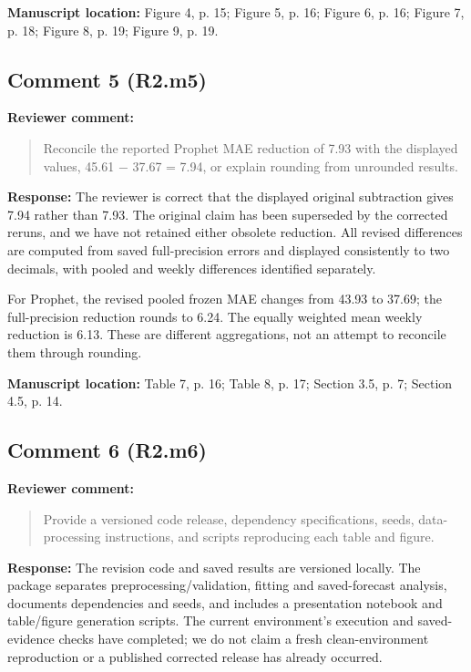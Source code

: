 \documentclass[11pt,a4paper]{article}
\begin{document}
\textbf{Manuscript location:} Figure 4, p. 15; Figure 5, p. 16; Figure 6, p. 16; Figure 7, p. 18; Figure 8, p. 19; Figure 9, p. 19.
\begin{samepage}
\subsection*{Comment 5 (R2.m5)}
\textbf{Reviewer comment:}
\begin{quote}\small Reconcile the reported Prophet MAE reduction of 7.93 with the displayed values, 45.61 $-$ 37.67 = 7.94, or explain rounding from unrounded results.\end{quote}
\end{samepage}
\textbf{Response:}
The reviewer is correct that the displayed original subtraction gives 7.94 rather than 7.93. The original claim has been superseded by the corrected reruns, and we have not retained either obsolete reduction. All revised differences are computed from saved full-precision errors and displayed consistently to two decimals, with pooled and weekly differences identified separately.

For Prophet, the revised pooled frozen MAE changes from 43.93 to 37.69; the full-precision reduction rounds to 6.24. The equally weighted mean weekly reduction is 6.13. These are different aggregations, not an attempt to reconcile them through rounding.

\textbf{Manuscript location:} Table 7, p. 16; Table 8, p. 17; Section 3.5, p. 7; Section 4.5, p. 14.
\begin{samepage}
\subsection*{Comment 6 (R2.m6)}
\textbf{Reviewer comment:}
\begin{quote}\small Provide a versioned code release, dependency specifications, seeds, data-processing instructions, and scripts reproducing each table and figure.\end{quote}
\end{samepage}
\textbf{Response:}
The revision code and saved results are versioned locally. The package separates preprocessing/validation, fitting and saved-forecast analysis, documents dependencies and seeds, and includes a presentation notebook and table/figure generation scripts. The current environment's execution and saved-evidence checks have completed; we do not claim a fresh clean-environment reproduction or a published corrected release has already occurred.
\end{document}
